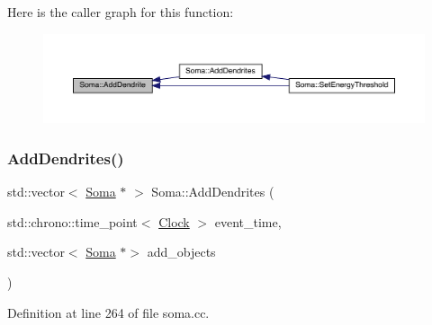Here is the caller graph for this function\+:
\nopagebreak
\begin{figure}[H]
\begin{center}
\leavevmode
\includegraphics[width=350pt]{class_soma_acc198b8ec11c3f2e43d3ba9a16ce84db_icgraph}
\end{center}
\end{figure}
\mbox{\label{class_soma_a9874f03b33413b06ca74a3143cc35331}} 
\subsubsection{\texorpdfstring{Add\+Dendrites()}{AddDendrites()}}
{\footnotesize\ttfamily std\+::vector$<$ \hyperlink{class_soma}{Soma} $\ast$ $>$ Soma\+::\+Add\+Dendrites (\begin{DoxyParamCaption}\item[{std\+::chrono\+::time\+\_\+point$<$ \hyperlink{universe_8h_a0ef8d951d1ca5ab3cfaf7ab4c7a6fd80}{Clock} $>$}]{event\+\_\+time,  }\item[{std\+::vector$<$ \hyperlink{class_soma}{Soma} $\ast$$>$}]{add\+\_\+objects }\end{DoxyParamCaption})}



Definition at line 264 of file soma.\+cc.

